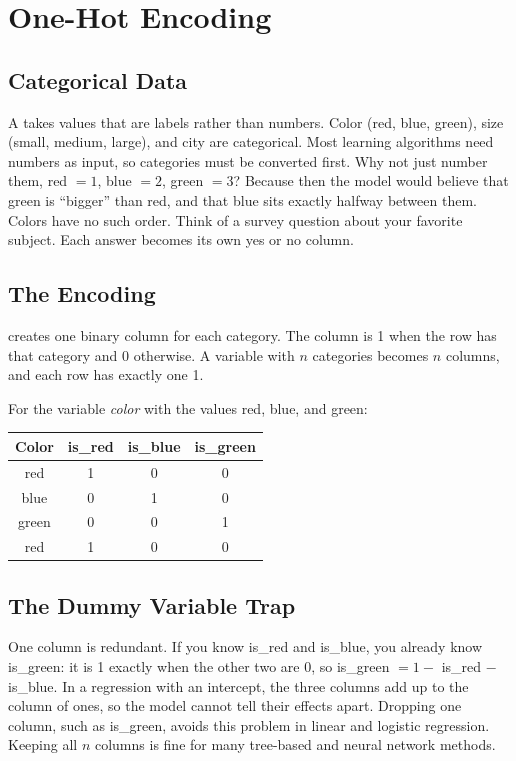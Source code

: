 \chapter{One-Hot Encoding}

\section{Categorical Data}
A  takes values that are labels rather than numbers. Color (red, blue, green),
size (small, medium, large), and city are categorical. Most learning algorithms need numbers as input, so
categories must be converted first. Why not just number them, red $= 1$,
blue $= 2$, green $= 3$? Because then the model would believe that green is
``bigger'' than red, and that blue sits exactly halfway between them. Colors
have no such order. Think of a survey question about your favorite subject. Each answer becomes its own yes or no column.

\section{The Encoding}
 creates one binary column for each category. The column is 1 when the row has that
category and 0 otherwise. A variable with $n$ categories becomes $n$ columns, and each row has exactly one 1.

For the variable \emph{color} with the values red, blue, and green:

\begin{center}
\begin{tabular}{|c|c|c|c|}
\hline
Color & is\_red & is\_blue & is\_green \\
\hline
red & 1 & 0 & 0 \\
\hline
blue & 0 & 1 & 0 \\
\hline
green & 0 & 0 & 1 \\
\hline
red & 1 & 0 & 0 \\
\hline
\end{tabular}
\end{center}

\section{The Dummy Variable Trap}
One column is redundant. If you know is\_red and is\_blue, you already know is\_green: it is 1 exactly
when the other two are 0, so is\_green $= 1 -$ is\_red $-$ is\_blue. In a regression with an intercept,
the three columns add up to the column of ones, so the model cannot tell their effects apart. Dropping one column, such as is\_green, avoids this problem in linear and
logistic regression. Keeping all $n$ columns is fine for many tree-based and neural network methods.

